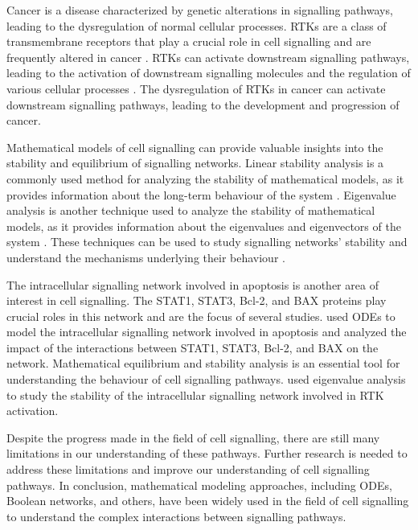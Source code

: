 Cancer is a disease characterized by genetic alterations in signalling pathways, leading to the dysregulation of normal cellular processes. RTKs are a class of transmembrane receptors that play a crucial role in cell signalling and are frequently altered in cancer \cite{sever2015signal}. RTKs can activate downstream signalling pathways, leading to the activation of downstream signalling molecules and the regulation of various cellular processes \cite{martin2003cell}. The dysregulation of RTKs in cancer can activate downstream signalling pathways, leading to the development and progression of cancer.

Mathematical models of cell signalling can provide valuable insights into the stability and equilibrium of signalling networks. Linear stability analysis is a commonly used method for analyzing the stability of mathematical models, as it provides information about the long-term behaviour of the system \cite{bardwell2007mathematical}. Eigenvalue analysis is another technique used to analyze the stability of mathematical models, as it provides information about the eigenvalues and eigenvectors of the system \cite{song2021quantitative}. These techniques can be used to study signalling networks' stability and understand the mechanisms underlying their behaviour \cite{tian2017inference}.

The intracellular signalling network involved in apoptosis is another area of interest in cell signalling. The STAT1, STAT3, Bcl-2, and BAX proteins play crucial roles in this network and are the focus of several studies.  used ODEs to model the intracellular signalling network involved in apoptosis and analyzed the impact of the interactions between STAT1, STAT3, Bcl-2, and BAX on the network. Mathematical equilibrium and stability analysis is an essential tool for understanding the behaviour of cell signalling pathways. \cite{mat2019mathematical} used eigenvalue analysis to study the stability of the intracellular signalling network involved in RTK activation. 

Despite the progress made in the field of cell signalling, there are still many limitations in our understanding of these pathways. Further research is needed to address these limitations and improve our understanding of cell signalling pathways. In conclusion, mathematical modeling approaches, including ODEs, Boolean networks, and others, have been widely used in the field of cell signalling to understand the complex interactions between signalling pathways.